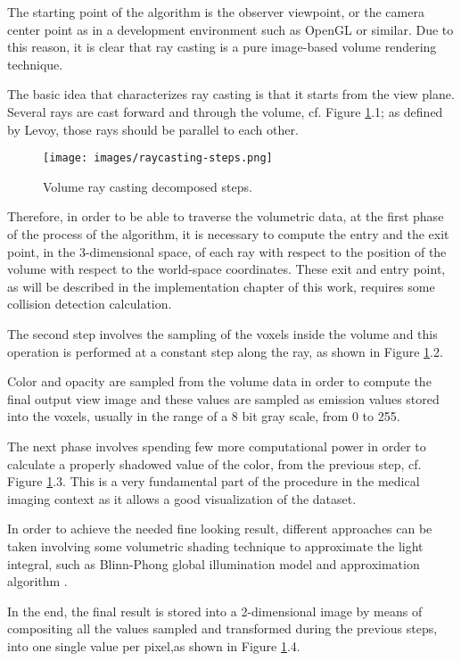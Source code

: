 \documentclass[12pt,a4paper]{extarticle}
\newcommand{\linespace}{\vspace{0pt}}
\begin{document}
The starting point of the algorithm is the observer viewpoint, or the camera center point as in a development environment such as OpenGL or similar. Due to this reason, it is clear that ray casting is a pure image-based volume rendering technique.
\linespace

The basic idea that characterizes ray casting is that it starts from the view plane. Several rays are cast forward and through the volume, cf. Figure \ref{fig:raycastingsteps}.1; as defined by Levoy, those rays should be parallel to each other.

\begin{figure}[hbtp]
\centering
\texttt{[image: images/raycasting-steps.png]}
\caption{Volume ray casting decomposed steps.}
\label{fig:raycastingsteps}
\end{figure}

Therefore, in order to be able to traverse the volumetric data, at the first phase of the process of the algorithm, it is necessary to compute the entry and the exit point, in the 3-dimensional space, of each ray with respect to the position of the volume with respect to the world-space coordinates. %
These exit and entry point, as will be described in the implementation chapter of this work, requires some collision detection calculation. 
\linespace

The second step involves the sampling of the voxels inside the volume and this operation is performed at a constant step along the ray, as shown in Figure \ref{fig:raycastingsteps}.2.

Color and opacity are sampled from the volume data in order to compute the final output view image and these values are sampled as emission values stored into the voxels, usually in the range of a 8 bit gray scale, from 0 to 255.
\linespace

The next phase involves spending few more computational power in order to calculate a properly shadowed value of the color, from the previous step, cf. Figure \ref{fig:raycastingsteps}.3. This is a very fundamental part of the procedure in the medical imaging context as it allows a good visualization of the dataset.

In order to achieve the needed fine looking result, different approaches can be taken involving some volumetric shading technique to approximate the light integral, such as Blinn-Phong global illumination model and approximation algorithm \cite{levoy_1988:4}.
\linespace

In the end, the final result is stored into a 2-dimensional image by means of compositing all the values sampled and transformed during the previous steps, into one single value per pixel,as shown in Figure \ref{fig:raycastingsteps}.4.
\end{document}
